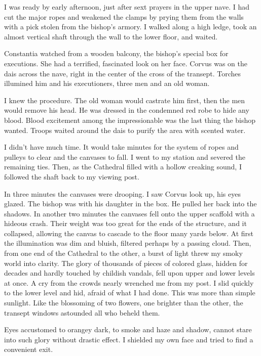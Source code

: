 I was ready by early afternoon, just after sext prayers in the upper nave. I had cut the major ropes and weakened the clamps by prying them from the walls with a pick stolen from the bishop’s armory. I walked along a high ledge, took an almost vertical shaft through the wall to the lower floor, and waited.

Constantia watched from a wooden balcony, the bishop’s special box for executions. She had a terrified, fascinated look on her face. Corvus was on the dais across the nave, right in the center of the cross of the transept. Torches illumined him and his executioners, three men and an old woman.

I knew the procedure. The old woman would castrate him first, then the men would remove his head. He was dressed in the condemned red robe to hide any blood. Blood excitement among the impressionable was the last thing the bishop wanted. Troops waited around the dais to purify the area with scented water.

I didn’t have much time. It would take minutes for the system of ropes and pulleys to clear and the canvases to fall. I went to my station and severed the remaining ties. Then, as the Cathedral filled with a hollow creaking sound, I followed the shaft back to my viewing post.

In three minutes the canvases were drooping. I saw Corvus look up, his eyes glazed. The bishop was with his daughter in the box. He pulled her back into the shadows. In another two minutes the canvases fell onto the upper scaffold with a hideous crash. Their weight was too great for the ends of the structure, and it collapsed, allowing the canvas to cascade to the floor many yards below. At first the illumination was dim and bluish, filtered perhaps by a passing cloud. Then, from one end of the Cathedral to the other, a burst of light threw my smoky world into clarity. The glory of thousands of pieces of colored glass, hidden for decades and hardly touched by childish vandals, fell upon upper and lower levels at once. A cry from the crowds nearly wrenched me from my post. I slid quickly to the lower level and hid, afraid of what I had done. This was more than simple sunlight. Like the blossoming of two flowers, one brighter than the other, the transept windows astounded all who beheld them.

Eyes accustomed to orangey dark, to smoke and haze and shadow, cannot stare into such glory without drastic effect. I shielded my own face and tried to find a convenient exit.

